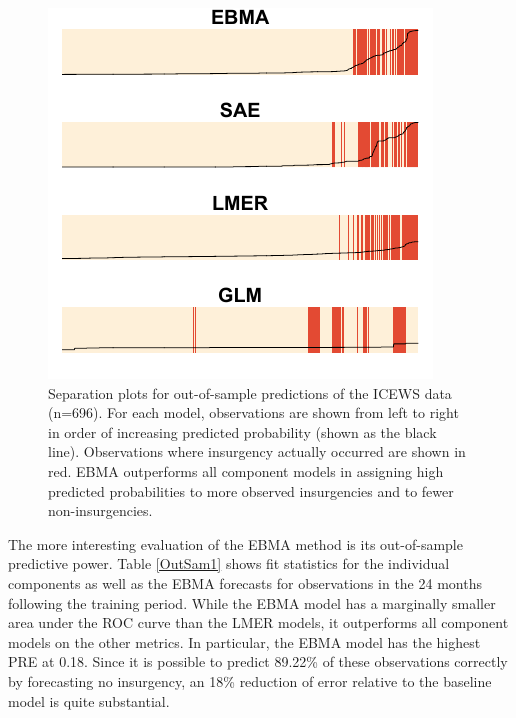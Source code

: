 \documentclass[pdftex,12pt,fullpage,oneside]{amsart}
\begin{document}
\begin{figure}
\hspace{-10pt}
\vspace{-195pt}
  \caption{\footnotesize Separation plots for out-of-sample
    predictions of the ICEWS data (n=696). For each model,
    observations are shown from left to right in order of increasing
    predicted probability (shown as the black line). Observations
    where insurgency actually occurred are shown in red. EBMA
    outperforms all component models in assigning high predicted
    probabilities to more observed insurgencies and to fewer
    non-insurgencies.}
\label{OutSam1sep}
\centering
\includegraphics[]{OutSampleNew.pdf}
\vspace{-25pt}
\end{figure}


The more interesting evaluation of the EBMA method is its
out-of-sample predictive power. Table \ref{OutSam1} shows fit
statistics for the individual components as well as the EBMA forecasts
for observations in the 24 months following the training period.
While the EBMA model has a marginally smaller area under the ROC curve
than the LMER models, it outperforms all component models on the other
metrics. In particular, the EBMA model has the highest PRE at 0.18.
Since it is possible to predict 89.22\% of these observations
correctly by forecasting no insurgency, an 18\% reduction of error
relative to the baseline model is quite substantial.
\end{document}

